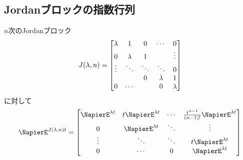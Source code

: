         \subsection{Jordanブロックの指数行列}
            \begin{shadebox}
                $n$次のJordanブロック
                \[J(\lambda, n) = \begin{bmatrix} \lambda & 1 & 0 & \cdots & 0\\0 & \lambda & 1 & &\vdots\\\vdots & \ddots & \ddots & \ddots & 0\\& & 0 & \lambda & 1\\0 & \cdots & & 0 & \lambda \end{bmatrix}\]
                に対して
                \[
                    \NapierE^{J(\lambda, n)t} =
                    \begin{bmatrix}
                        \NapierE^{\lambda t}	& t\NapierE^{\lambda t}	& \cdots	& \frac{t^{n-1}}{(n-1)!}\NapierE^{\lambda t}\\
                        0				& \NapierE^{\lambda t}		& \ddots	& \vdots\\
                        \vdots			& \ddots			& \ddots	& t\NapierE^{\lambda t}\\
                        0				& \cdots			& 0			& \NapierE^{\lambda t}
                    \end{bmatrix}
                \]
            \end{shadebox}
